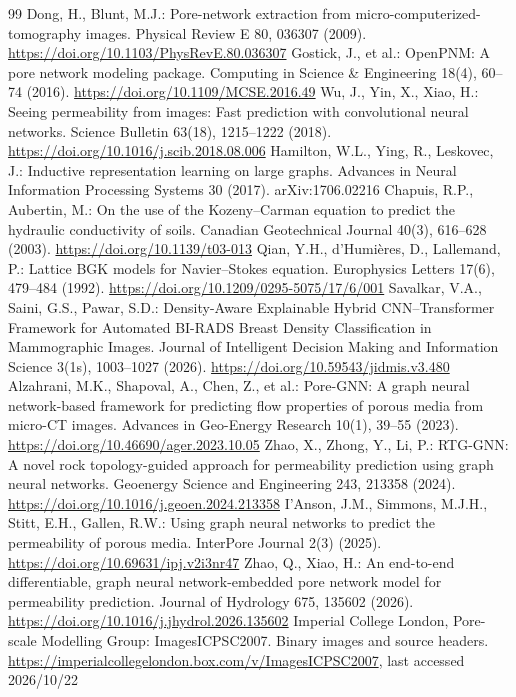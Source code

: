 \documentclass[a4paper]{svproc}
\begin{document}
\begin{thebibliography}{99}
 Dong, H., Blunt, M.J.: Pore-network extraction from micro-computerized-tomography images. Physical Review E 80, 036307 (2009). \url{https://doi.org/10.1103/PhysRevE.80.036307}
 Gostick, J., et al.: OpenPNM: A pore network modeling package. Computing in Science \& Engineering 18(4), 60--74 (2016). \url{https://doi.org/10.1109/MCSE.2016.49}
 Wu, J., Yin, X., Xiao, H.: Seeing permeability from images: Fast prediction with convolutional neural networks. Science Bulletin 63(18), 1215--1222 (2018). \url{https://doi.org/10.1016/j.scib.2018.08.006}
 Hamilton, W.L., Ying, R., Leskovec, J.: Inductive representation learning on large graphs. Advances in Neural Information Processing Systems 30 (2017). arXiv:1706.02216
 Chapuis, R.P., Aubertin, M.: On the use of the Kozeny--Carman equation to predict the hydraulic conductivity of soils. Canadian Geotechnical Journal 40(3), 616--628 (2003). \url{https://doi.org/10.1139/t03-013}
 Qian, Y.H., d'Humières, D., Lallemand, P.: Lattice BGK models for Navier--Stokes equation. Europhysics Letters 17(6), 479--484 (1992). \url{https://doi.org/10.1209/0295-5075/17/6/001}
 Savalkar, V.A., Saini, G.S., Pawar, S.D.: Density-Aware Explainable Hybrid CNN--Transformer Framework for Automated BI-RADS Breast Density Classification in Mammographic Images. Journal of Intelligent Decision Making and Information Science 3(1s), 1003--1027 (2026). \url{https://doi.org/10.59543/jidmis.v3.480}
 Alzahrani, M.K., Shapoval, A., Chen, Z., et al.: Pore-GNN: A graph neural network-based framework for predicting flow properties of porous media from micro-CT images. Advances in Geo-Energy Research 10(1), 39--55 (2023). \url{https://doi.org/10.46690/ager.2023.10.05}
 Zhao, X., Zhong, Y., Li, P.: RTG-GNN: A novel rock topology-guided approach for permeability prediction using graph neural networks. Geoenergy Science and Engineering 243, 213358 (2024). \url{https://doi.org/10.1016/j.geoen.2024.213358}
 I'Anson, J.M., Simmons, M.J.H., Stitt, E.H., Gallen, R.W.: Using graph neural networks to predict the permeability of porous media. InterPore Journal 2(3) (2025). \url{https://doi.org/10.69631/ipj.v2i3nr47}
 Zhao, Q., Xiao, H.: An end-to-end differentiable, graph neural network-embedded pore network model for permeability prediction. Journal of Hydrology 675, 135602 (2026). \url{https://doi.org/10.1016/j.jhydrol.2026.135602}
 Imperial College London, Pore-scale Modelling Group: ImagesICPSC2007. Binary images and source headers. \url{https://imperialcollegelondon.box.com/v/ImagesICPSC2007}, last accessed 2026/10/22

\end{thebibliography}
\end{document}
